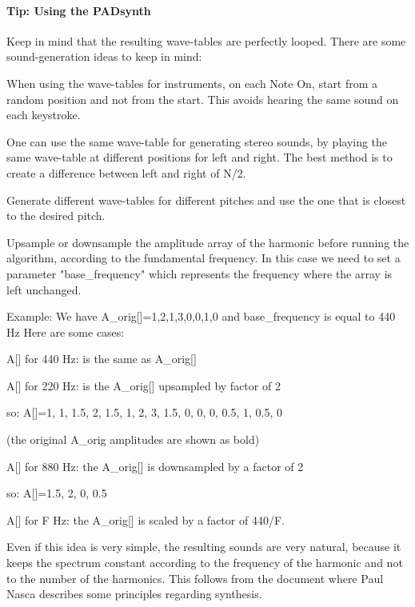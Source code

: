 \paragraph{Tip: Using the PADsynth}
\label{tips_using_the_padsynth}

   Keep in mind that the resulting wave-tables are perfectly looped.
   There are some sound-generation ideas to keep in mind:

   \begin{enumber}
      \item When using the wave-tables for instruments, on each Note On, start
         from a random position and not from the start. This avoids hearing the
         same sound on each keystroke.
      \item One can use the same wave-table for generating stereo sounds, by
         playing the same wave-table at different positions for left and right.
         The best method is to create a difference between left and
         right of N/2.
      \item Generate different wave-tables for different pitches and use the
         one that is closest to the desired pitch.
      \item Upsample or downsample the amplitude array of the harmonic before
         running the algorithm, according to the fundamental frequency. In this
         case we need to set a parameter "base\_frequency" which represents the
         frequency where the array is left unchanged. 
   \end{enumber}

   Example:
   We have A\_orig[]={1,2,1,3,0,0,1,0} and base\_frequency is equal to 440 Hz
   Here are some cases:

A[] for 440 Hz: is the same as A\_orig[] 

A[] for 220 Hz: is the A\_orig[] upsampled by factor of 2

so: A[]={1, 1, 1.5, 2, 1.5, 1, 2, 3, 1.5, 0, 0, 0, 0.5, 1, 0.5, 0}

(the original A\_orig amplitudes are shown as bold) 

A[] for 880 Hz: the A\_orig[] is downsampled by a factor of 2

so: A[]={1.5, 2, 0, 0.5} 

A[] for F Hz: the A\_orig[] is scaled by a factor of 440/F.

   Even if this idea is very simple, the resulting sounds are very natural,
   because it keeps the spectrum constant according to the frequency of the
   harmonic and not to the number of the harmonics. This follows from the
   document where Paul Nasca describes some principles regarding synthesis.

